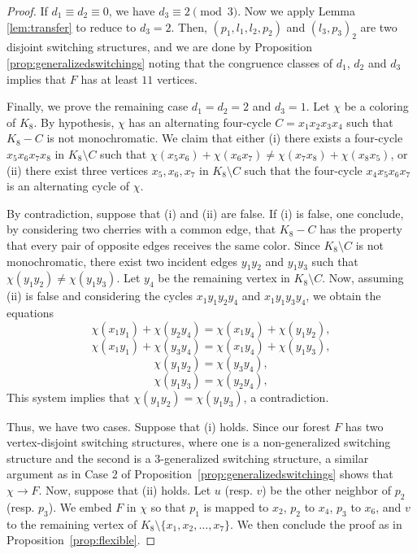 \documentclass[11pt]{article}
\begin{document}
\begin{proof}
    If $d_1 \equiv d_2 \equiv 0$, we have $d_3 \equiv 2 \pmod 3$. Now we apply Lemma \ref{lem:transfer} to reduce to $d_3=2$. Then, $(p_1,l_1,l_2,p_2)$ and $(l_3,p_3)_2$ are two disjoint switching structures, and we are done by Proposition \ref{prop:generalizedswitchings} noting that the congruence classes of $d_1$, $d_2$ and $d_3$ implies that $F$ has at least $11$ vertices.

   Finally, we prove the remaining case \( d_1 = d_2 = 2 \) and \( d_3 = 1 \). Let \( \chi \) be a coloring of \( K_8 \). By hypothesis, \( \chi \) has an alternating four-cycle \( C = x_1x_2x_3x_4 \) such that \( K_8 - C \) is not monochromatic. We claim that either (i) there exists a four-cycle \( x_5x_6x_7x_8 \) in \( K_8 \setminus C \) such that  $\chi(x_5x_6) + \chi(x_6x_7) \neq \chi(x_7x_8) + \chi(x_8x_5)$, or (ii) there exist three vertices \( x_5, x_6, x_7 \) in \( K_8 \setminus C \) such that the four-cycle \( x_4x_5x_6x_7 \) is an alternating cycle of \( \chi \). 
   
   By contradiction, suppose that (i) and (ii) are false. If (i) is false, one conclude, by considering two cherries with a common edge, that \( K_8 - C \) has the property that every pair of opposite edges receives the same color. Since \( K_8 \setminus C \) is not monochromatic, there exist two incident edges \( y_1y_2 \) and \( y_1y_3 \) such that \( \chi(y_1y_2) \neq \chi(y_1y_3) \). Let \( y_4 \) be the remaining vertex in \( K_8 \setminus C \). Now, assuming (ii) is false and considering the cycles \( x_1y_1y_2y_4 \) and \( x_1y_1y_3y_4 \), we obtain the equations  
\[
\chi(x_1y_1) + \chi(y_2y_4) = \chi(x_1y_4) + \chi(y_1y_2),
\]
\[
\chi(x_1y_1) + \chi(y_3y_4) = \chi(x_1y_4) + \chi(y_1y_3),\]
\[\chi(y_1y_2) = \chi(y_3y_4),\]
\[\chi(y_1y_3) = \chi(y_2y_4),
\]
This system implies that \( \chi(y_1y_2) = \chi(y_1y_3) \), a contradiction. 

Thus, we have two cases. Suppose that (i) holds. Since our forest \( F \) has two vertex-disjoint switching structures, where one is a non-generalized switching structure and the second is a 3-generalized switching structure, a similar argument as in Case 2 of Proposition~\ref{prop:generalizedswitchings} shows that \( \chi \rightarrow F \). Now, suppose that (ii) holds. Let \( u \) (resp. \( v \)) be the other neighbor of \( p_2 \) (resp. \( p_3 \)). We embed \( F \) in \( \chi \) so that \( p_1 \) is mapped to \( x_2 \), \( p_2 \) to \( x_4 \), \( p_3 \) to \( x_6 \), and \( v \) to the remaining vertex of \( K_8 \setminus \{x_1, x_2, \dots, x_7\} \). We then conclude the proof as in Proposition~\ref{prop:flexible}.
    


\end{proof}
\end{document}
